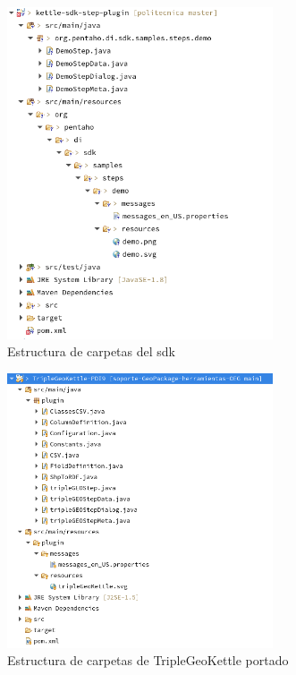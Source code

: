 \begin{figure}[H]
    \includegraphics[width=0.7\textwidth]{images/directorios-sdk.png}
    \centering
    \caption{Estructura de carpetas del sdk}
    \label{fig:directorios-sdk}
\end{figure}

\begin{figure}[H]
    \includegraphics[width=0.7\textwidth]{images/directorios-TGK.png}
    \centering
    \caption{Estructura de carpetas de TripleGeoKettle portado}
    \label{fig:directorios-TGK}
\end{figure}

